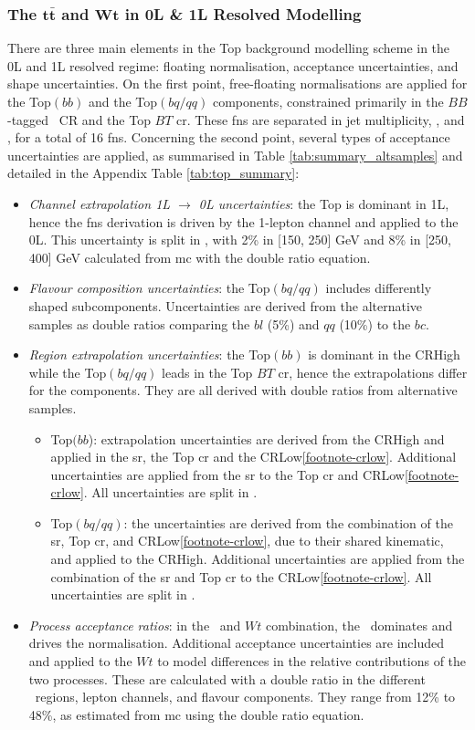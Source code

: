 \subsubsection{The $\boldsymbol{t\bar{t}}$ and $\boldsymbol{Wt}$ in 0L \& 1L Resolved Modelling}
There are three main elements in the Top background modelling scheme in the 0L and 1L resolved regime: floating normalisation, acceptance uncertainties, and shape uncertainties. On the first point, free-floating normalisations are applied for the Top$(bb)$ and the Top$(bq/qq)$ components, constrained primarily in the $BB$-tagged \highdr\ CR and the Top $BT$ \gls{cr}. These \glspl{fn} are separated in jet multiplicity, \nj, and \ptv, for a total of 16 \glspl{fn}. Concerning the second point, several types of acceptance uncertainties are applied, as summarised in Table \ref{tab:summary_altsamples} and detailed in the Appendix Table \ref{tab:top_summary}:
\begin{itemize}[leftmargin=*]
    \item \textit{Channel extrapolation 1L $\rightarrow$ 0L uncertainties}: the Top is dominant in 1L, hence the \glspl{fn} derivation is driven by the 1-lepton channel and applied to the 0L. This uncertainty is split in \ptv, with 2\% in [150, 250] GeV and 8\% in [250, 400] GeV calculated from \gls{mc} with the double ratio equation.
    \item \textit{Flavour composition uncertainties}: the Top$(bq/qq)$ includes differently shaped subcomponents. Uncertainties are derived from the alternative samples as double ratios comparing the $bl$ (5\%) and $qq$ (10\%) to the $bc$. 
    \item \textit{Region extrapolation uncertainties}: the Top$(bb)$ is dominant in the CRHigh while the Top$(bq/qq)$ leads in the Top $BT$ \gls{cr}, hence the extrapolations differ for the components. They are all derived with double ratios from alternative samples.
    \begin{itemize}
        \item Top$(bb$): extrapolation uncertainties are derived from the CRHigh and applied in the \gls{sr}, the Top \gls{cr} and the CRLow\cref{footnote-crlow}. Additional uncertainties are applied from the \gls{sr} to the Top \gls{cr} and CRLow\cref{footnote-crlow}. All uncertainties are split in \ptv.
        \item Top$(bq/qq)$: the uncertainties are derived from the combination of the \gls{sr}, Top \gls{cr}, and CRLow\cref{footnote-crlow}, due to their shared kinematic, and applied to the CRHigh. Additional uncertainties are applied from the combination of the \gls{sr} and Top \gls{cr} to the CRLow\cref{footnote-crlow}. All uncertainties are split in \ptv.
    \end{itemize}
    \item \textit{Process acceptance ratios}: in the \ttb\ and $Wt$ combination, the \ttb\ dominates and drives the normalisation. Additional acceptance uncertainties are included and applied to the $Wt$ to model differences in the relative contributions of the two processes. These are calculated with a double ratio in the different \ptv\ regions, lepton channels, and flavour components. They range from 12\% to 48\%, as estimated from \gls{mc} using the double ratio equation.
\end{itemize}

